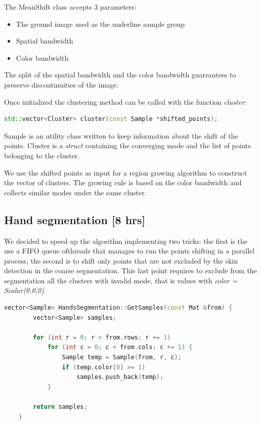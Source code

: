 The MeanShift class accepts 3 parameters:
\begin{itemize}
    \item The ground image used as the underline sample group
    \item Spatial bandwidth
    \item Color bandwidth
\end{itemize}

The split of the spatial bandwidth and the color bandwidth guarrantees to
preserve discontinuities of the image.

Once initialized the clustering method can be called with the function
\textit{cluster}:

\begin{lstlisting}[language = c++]
    std::vector<Cluster> cluster(const Sample *shifted_points);
    \end{lstlisting}

Sample is an utility class written to keep information about the shift of
the points.
Cluster is a \textit{struct} containing the converging mode and the list of
points belonging to the cluster.

We use the shifted points as input for a region growing algorithm to construct
the vector of clusters. The growing rule is based on the color bandwidth and
collects similar modes under the same cluster.

\subsection{Hand segmentation [8 hrs]}
We decided to speed up the algorithm implementing two tricks: the first is the
use a FIFO queue ofthreads that manages to run the points shifting in a
parallel process; the second is to shift only points that are not excluded by
the skin detection in the coarse
segmentation. This last point requires to exclude from the segmentation all the
clusters with invalid mode, that is values with \textit{color = Scalar(0,0,0)}.

\begin{lstlisting}[language = c++]
    vector<Sample> HandsSegmentation::GetSamples(const Mat &from) {
        vector<Sample> samples;
    
        for (int r = 0; r < from.rows; r += 1)
            for (int c = 0; c < from.cols; c += 1) {
                Sample temp = Sample(from, r, c);
                if (temp.color[0] >= 1)
                    samples.push_back(temp);
            }
    
        return samples;
    }
\end{lstlisting}

